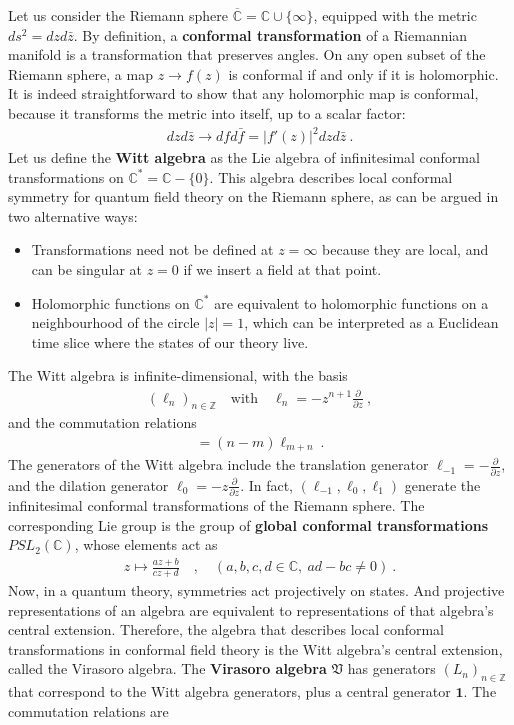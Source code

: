 \documentclass[12pt, a4paper]{article}
\theoremstyle{break}
\begin{document}
Let us consider the Riemann sphere $\overline{\mathbb{C}}=\mathbb{C}\cup \{\infty\}$, equipped with the metric $ds^2 = dzd\bar z$. By definition, a \textbf{conformal transformation} of a Riemannian manifold is a transformation that preserves angles. On any open subset of the Riemann sphere, a map $z\to f(z)$ is conformal if and only if it is holomorphic. It is indeed straightforward to show that any holomorphic map is conformal,
because it transforms the metric into itself, up to a scalar factor: 
\begin{align}
 dzd\bar z\to dfd\bar f = |f'(z)|^2 dzd\bar z\ .
\end{align}
Let us define the \textbf{Witt algebra} as the Lie algebra of infinitesimal conformal transformations on $\mathbb{C}^*= \mathbb{C}-\{0\}$. This algebra describes local conformal symmetry for quantum field theory on the Riemann sphere, as can be argued in two alternative ways:
\begin{itemize}
 \item Transformations need not be defined at $z=\infty$ because they are local, and can be singular at $z=0$ if we insert a field at that point.
 \item Holomorphic functions on $\mathbb{C}^*$ are equivalent to holomorphic functions on a neighbourhood of the circle $|z|=1$, which can be interpreted as a Euclidean time slice where the states of our theory live. 
\end{itemize}
The Witt algebra is infinite-dimensional, with the basis 
\begin{align}
 \left(\ell_n\right)_{n\in\mathbb{Z}}  \quad \text{with} \quad \ell_n = -z^{n+1}\frac{\partial}{\partial z}\ ,
 \label{lpz}
\end{align}
and the commutation relations 
\begin{align}
 [\ell_n,\ell_m] = (n-m)\ell_{m+n}\ .
\end{align}
The generators of the Witt algebra include the translation generator $\ell_{-1} = -\frac{\partial}{\partial z}$, and the dilation generator $\ell_0 = -z\frac{\partial}{\partial z}$. In fact, $(\ell_{-1},\ell_0,\ell_1)$ generate the infinitesimal conformal transformations of the Riemann sphere.
The corresponding Lie group is the group of \textbf{global conformal transformations} $PSL_2(\mathbb{C})$, whose elements act as 
\begin{align}
 z \mapsto \frac{az+b}{cz+d}\quad , \quad (a,b,c,d\in \mathbb{C},\ ad-bc\neq 0)\ .
 \label{abcd}
\end{align}
Now, in a quantum theory, symmetries act projectively on states. And projective representations of an algebra are equivalent to representations of that algebra's central extension. Therefore, the algebra that describes local conformal transformations in conformal field theory is the Witt algebra's central extension, called the Virasoro algebra. The \textbf{Virasoro algebra} $\mathfrak{V}$ has generators $(L_n)_{n\in\mathbb{Z}}$ that correspond to the Witt algebra generators, plus a central generator $\mathbf 1$. The commutation relations are 
\end{document}
